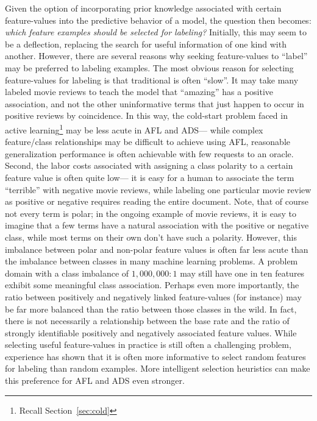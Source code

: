 Given the option of incorporating prior knowledge associated with certain feature-values into the predictive behavior of a model, the question then becomes: \emph{which feature examples should be selected for labeling?} Initially, this may seem to be a deflection, replacing the search for useful information of one kind with another. However, there are several reasons why seeking feature-values to ``label'' may be preferred to labeling examples. The most obvious reason for selecting feature-values for labeling is that traditional is often ``slow''. It may take many labeled movie reviews to teach the model that ``amazing'' has a positive association, and not the other uninformative terms that just happen to occur in positive reviews by coincidence. In this way, the cold-start problem faced in active learning\footnote{Recall Section~\ref{sec:cold}} may be less acute in AFL and ADS--- while complex feature/class relationships may be difficult to achieve using AFL, reasonable generalization performance is often achievable with few requests to an oracle. Second, the labor costs associated with assigning a class polarity to a certain feature value is often quite low--- it is easy for a human to associate the term ``terrible'' with negative movie reviews, while labeling one particular movie review as positive or negative requires reading the entire document. Note, that of course not every term is polar; in the ongoing example of movie reviews, it is easy to imagine that a few terms have a  natural association with the positive or negative class, while most terms on their own don't have such a polarity. However, this imbalance between polar and non-polar feature values is often far less acute than the imbalance between classes in many machine learning problems. A problem domain with a class imbalance of $1,000,000:1$ may still have one in ten features exhibit some meaningful class association. Perhaps even more importantly, the ratio between positively and negatively linked feature-values (for instance) may be far more balanced than the ratio between those classes in the wild. In fact, there is not necessarily a relationship between the base rate and the ratio of strongly identifiable positively and negatively associated feature values. While selecting useful feature-values in practice is still often a challenging problem, experience has shown that it is often more informative to select random features for labeling than random examples. More intelligent selection heuristics can make this preference for AFL and ADS even stronger.

